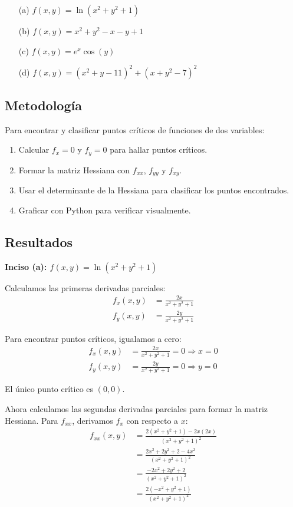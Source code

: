\documentclass{article}
\begin{document}
\begin{enumerate}
  \item[(a)] $f(x,y) = \ln(x^{2} + y^{2} + 1)$
  \item[(b)] $f(x,y) = x^{2} + y^{2} - x - y + 1$
  \item[(c)] $f(x,y) = e^{x}\cos(y)$
  \item[(d)] $f(x,y) = (x^{2} + y - 11)^{2} + (x + y^{2} - 7)^{2}$
\end{enumerate}

\subsection{Metodología}

Para encontrar y clasificar puntos críticos de funciones de dos variables:
\begin{enumerate}
    \item Calcular $f_x = 0$ y $f_y = 0$ para hallar puntos críticos.
    \item Formar la matriz Hessiana con $f_{xx}$, $f_{yy}$ y $f_{xy}$.
    \item Usar el determinante de la Hessiana para clasificar los puntos encontrados.
    \item Graficar con Python para verificar visualmente.
\end{enumerate}

\subsection{Resultados}
\setcounter{equation}{0}

\textbf{Inciso (a): $f(x,y) = \ln(x^{2} + y^{2} + 1)$}

Calculamos las primeras derivadas parciales:
\begin{align}
f_x(x,y) &= \frac{2x}{x^2 + y^2 + 1} \\
f_y(x,y) &= \frac{2y}{x^2 + y^2 + 1}
\end{align}

Para encontrar puntos críticos, igualamos a cero:
\begin{align}
f_x(x,y) &= \frac{2x}{x^2 + y^2 + 1} = 0 \Rightarrow x = 0 \\
f_y(x,y) &= \frac{2y}{x^2 + y^2 + 1} = 0 \Rightarrow y = 0
\end{align}

El único punto crítico es $(0,0)$.

Ahora calculamos las segundas derivadas parciales para formar la matriz Hessiana. Para $f_{xx}$, derivamos $f_x$ con respecto a $x$:
\begin{align}
f_{xx}(x,y) &=  \frac{2(x^2 + y^2 + 1) - 2x(2x)}{(x^2 + y^2 + 1)^2} \\
&= \frac{2x^2 + 2y^2 + 2 - 4x^2}{(x^2 + y^2 + 1)^2} \\
&= \frac{-2x^2 + 2y^2 + 2}{(x^2 + y^2 + 1)^2} \\
&= \frac{2(-x^2 + y^2 + 1)}{(x^2 + y^2 + 1)^2}
\end{align}
\end{document}
